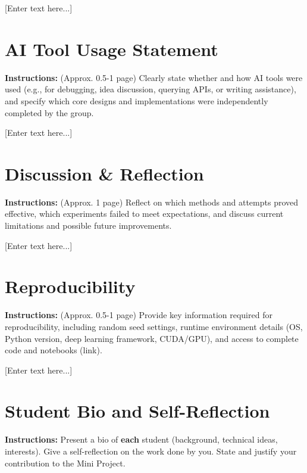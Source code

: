 \documentclass[journal]{IEEEtran}
\begin{document}
[Enter text here...]

\section{AI Tool Usage Statement}
\label{sec:ai}
\textbf{Instructions:} (Approx. 0.5-1 page)
Clearly state whether and how AI tools were used (e.g., for debugging, idea discussion, querying APIs, or writing assistance), and specify which core designs and implementations were independently completed by the group.

[Enter text here...]

\section{Discussion \& Reflection}
\label{sec:discussion}
\textbf{Instructions:} (Approx. 1 page)
Reflect on which methods and attempts proved effective, which experiments failed to meet expectations, and discuss current limitations and possible future improvements.

[Enter text here...]

\section{Reproducibility}
\label{sec:reproducibility}
\textbf{Instructions:} (Approx. 0.5-1 page)
Provide key information required for reproducibility, including random seed settings, runtime environment details (OS, Python version, deep learning framework, CUDA/GPU), and access to complete code and notebooks (link).

[Enter text here...]

\section{Student Bio and Self-Reflection}
\label{sec:bio}
\textbf{Instructions:}
Present a bio of \textbf{each} student (background, technical ideas, interests). Give a self-reflection on the work done by you. State and justify your contribution to the Mini Project.
\end{document}

